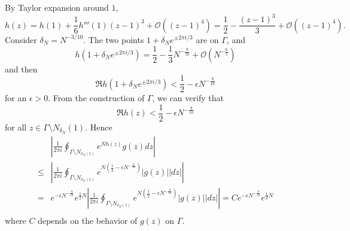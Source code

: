 \documentclass[11pt, a4paper]{article}
\numberwithin{equation}{section}
\newcommand{\bigO}{\mathcal{O}}
\theoremstyle{definition}
\theoremstyle{remark}
\begin{document}
By Taylor expansion around $1$,
\begin{equation}
  h(z) = h(1) + \frac{1}{6} h'''(1) (z - 1)^3 + \bigO((z - 1)^4) = \frac{1}{2} - \frac{(z - 1)^3}{3} + \bigO((z - 1)^4).
\end{equation}
Consider $\delta_N = N^{-3/10}$. The two points $1 + \delta_N e^{\pm 2\pi i/3}$ are on $\Gamma$, and
\begin{equation}
  h(1 + \delta_N e^{\pm 2\pi i/3}) = \frac{1}{2} - \frac{1}{3} N^{-\frac{9}{10}} + \bigO(N^{-\frac{6}{5}})
\end{equation}
and then
\begin{equation}
  \Re h(1 + \delta_N e^{\pm 2\pi i/3}) < \frac{1}{2} - \epsilon N^{-\frac{9}{10}}
\end{equation}
for an $\epsilon > 0$. From the construction of $\Gamma$, we can verify that
\begin{equation}
  \Re h(z) < \frac{1}{2} - \epsilon N^{-\frac{9}{10}}
\end{equation}
for all $z \in \Gamma \setminus N_{\delta_N}(1)$. Hence
\begin{equation} \label{eq:noness_part_steepest_descent}
  \begin{split}
    & \left\lvert \frac{1}{2\pi i} \oint_{\Gamma \setminus N_{\delta_N(1)}} e^{Nh(z)} g(z) dz \right\rvert \\
    \leq {}& \left\lvert \frac{1}{2\pi i} \oint_{\Gamma \setminus N_{\delta_N(1)}} e^{N(\frac{1}{2} - \epsilon N^{-\frac{9}{10}})} \lvert g(z) \rvert \lvert dz \rvert \right\rvert \\
    = {}& e^{- \epsilon N^{-\frac{9}{10}}} e^{\frac{1}{2} N} \left\lvert \frac{1}{2\pi i} \oint_{\Gamma \setminus N_{\delta_N(1)}} e^{N(\frac{1}{2} - \epsilon N^{-\frac{9}{10}})} \lvert g(z) \rvert \lvert dz \rvert \right\rvert = C e^{- \epsilon N^{-\frac{9}{10}}} e^{\frac{1}{2} N} \\
  \end{split}
\end{equation}
where $C$ depends on the behavior of $g(z)$ on $\Gamma$.
\end{document}

